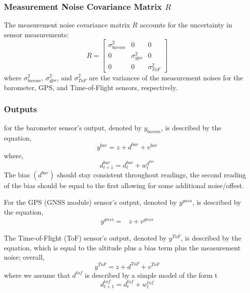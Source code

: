\documentclass{article}
\begin{document}
    \subsubsection*{Measurement Noise Covariance Matrix \( R \)}
    The measurement noise covariance matrix \( R \) accounts for the uncertainty in sensor measurements:
    \begin{equation}
    R = 
    \begin{bmatrix}
    \sigma_{barom}^2 & 0 & 0 \\
    0 & \sigma_{gps}^2 & 0 \\
    0 & 0 & \sigma_{ToF}^2
    \end{bmatrix}
    \end{equation}
    where \( \sigma_{barom}^2 \), \( \sigma_{gps}^2 \), and \( \sigma_{ToF}^2 \) are the variances of the measurement noises for the 
    barometer, GPS, and Time-of-Flight sensors, respectively.

    \subsubsection*{Outputs}
    for the barometer sensor's output, denoted by \( y_{barom} \), is described by the equation,
    \begin{equation}
    y^{bar} = z + d^{bar} + v^{bar}
    \end{equation}
    where, 
    \begin{equation}
        d^{bar}_{t+1} = d^{bar}_t + w_{t}^{d^{bar}}
    \end{equation}
    The bias $(d^{bar})$ should stay consistent throughout readings, 
    the second reading of the bias should be equal to the first allowing for some additional noise/offest.

    For the GPS (GNSS module) sensor's output, 
    denoted by \( y^{gnss} \), is described by the equation,
    \begin{subequations}
        \begin{align}
            y^{gnss} 
            {}={}&
            z + v^{gnss} 
        \end{align}
    \end{subequations}

    The Time-of-Flight (ToF) sensor's output, denoted by \( y^{ToF} \), is described by the equation, which is equal to the altitude plus a bias term plus the measurement noise; overall,
    \begin{equation}
    y^{ToF} = z + d^{ToF} + v^{ToF}
    \end{equation}
    where we assume that \(d^{tof}\) is described by a simple model of the form t
    \begin{equation}
    d^{tof}_{t+1} = d^{tof}_t + w^{tof}_t
    \end{equation}
\end{document}
